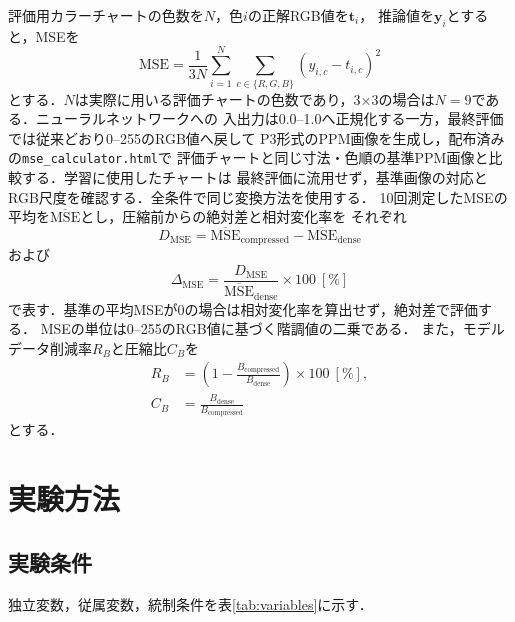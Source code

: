 \documentclass[a4paper,11pt]{article}
\begin{document}
評価用カラーチャートの色数を$N$，色$i$の正解RGB値を$\boldsymbol{t}_i$，
推論値を$\boldsymbol{y}_i$とすると，MSEを
\begin{equation}
  \mathrm{MSE}=\frac{1}{3N}\sum_{i=1}^{N}\sum_{c\in\{R,G,B\}}
  \left(y_{i,c}-t_{i,c}\right)^2
\end{equation}
とする．$N$は実際に用いる評価チャートの色数であり，3$\times$3の場合は$N=9$である．ニューラルネットワークへの
入出力は0.0--1.0へ正規化する一方，最終評価では従来どおり0--255のRGB値へ戻して
P3形式のPPM画像を生成し，配布済みの\texttt{mse\_calculator.html}で
評価チャートと同じ寸法・色順の基準PPM画像と比較する．学習に使用したチャートは
最終評価に流用せず，基準画像の対応とRGB尺度を確認する．全条件で同じ変換方法を使用する．
10回測定したMSEの平均を$\overline{\mathrm{MSE}}$とし，圧縮前からの絶対差と相対変化率を
それぞれ
\begin{equation}
  D_{\mathrm{MSE}}=\overline{\mathrm{MSE}}_{\mathrm{compressed}}-
  \overline{\mathrm{MSE}}_{\mathrm{dense}}
\end{equation}
および
\begin{equation}
  \Delta_{\mathrm{MSE}}=\frac{D_{\mathrm{MSE}}}
  {\overline{\mathrm{MSE}}_{\mathrm{dense}}}\times100\ [\%]
\end{equation}
で表す．基準の平均MSEが0の場合は相対変化率を算出せず，絶対差で評価する．
MSEの単位は0--255のRGB値に基づく階調値の二乗である．
また，モデルデータ削減率$R_B$と圧縮比$C_B$を
\begin{align}
  R_B &= \left(1-\frac{B_{\mathrm{compressed}}}{B_{\mathrm{dense}}}\right)\times100\ [\%],\\
  C_B &= \frac{B_{\mathrm{dense}}}{B_{\mathrm{compressed}}}
\end{align}
とする．

\Needspace{85mm}
\section{実験方法}

\subsection{実験条件}

独立変数，従属変数，統制条件を表\ref{tab:variables}に示す．
\end{document}
